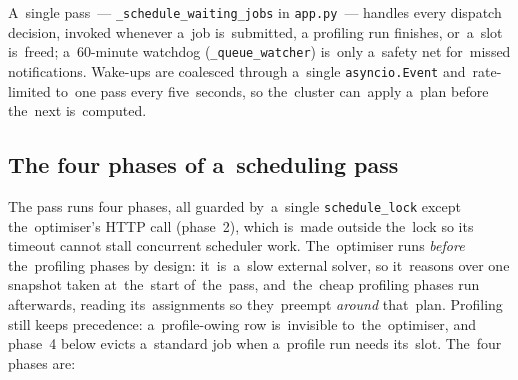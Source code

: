 A~single pass~--- \texttt{\_schedule\_waiting\_jobs} in \texttt{app.py}~---
handles every dispatch decision, invoked whenever a~job is~submitted, a
profiling run finishes, or~a~slot is~freed; a~60-minute watchdog
(\texttt{\_queue\_watcher}) is~only a~safety net for~missed notifications.
Wake-ups are coalesced through a~single \texttt{asyncio.Event} and~rate-limited
to~one pass every five~seconds, so the~cluster can~apply a~plan before the~next
is~computed.

\subsection{The four phases of a~scheduling pass}

The pass runs four phases, all guarded by~a~single
\texttt{schedule\_lock} except the~optimiser's HTTP call (phase~2),
which is~made outside the~lock so its timeout cannot stall concurrent
scheduler work.  The~optimiser runs \emph{before} the~profiling phases by
design: it~is~a~slow external solver, so it~reasons over one snapshot taken
at~the~start of~the~pass, and~the~cheap profiling phases run afterwards,
reading its~assignments so they~preempt \emph{around} that~plan.  Profiling
still keeps precedence: a~profile-owing row is~invisible to~the~optimiser, and
phase~4 below evicts a~standard job when a~profile run needs its~slot.  The~four
phases are:

